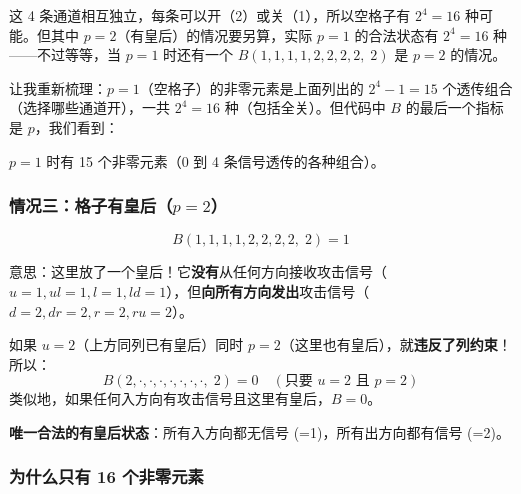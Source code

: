 \documentclass[12pt,a4paper]{article}
\begin{document}
这 4 条通道相互独立，每条可以开（2）或关（1），所以空格子有 $2^4 = 16$ 种可能。但其中 $p=2$（有皇后）的情况要另算，实际 $p=1$ 的合法状态有 $2^4 = 16$ 种——不过等等，当 $p=1$ 时还有一个 $B(1,1,1,1,2,2,2,2,\;2)$ 是 $p=2$ 的情况。

让我重新梳理：$p=1$（空格子）的非零元素是上面列出的 $2^4 - 1 = 15$ 个透传组合（选择哪些通道开），一共 $2^4 = 16$ 种（包括全关）。但代码中 $B$ 的最后一个指标是 $p$，我们看到：

$p=1$ 时有 15 个非零元素（0 到 4 条信号透传的各种组合）。

\subsubsection{情况三：格子有皇后（$p=2$）}

$$B(1,1,1,1,2,2,2,2,\;2) = 1$$

意思：这里放了一个皇后！它\textbf{没有}从任何方向接收攻击信号（$u=1, ul=1, l=1, ld=1$），但\textbf{向所有方向发出}攻击信号（$d=2, dr=2, r=2, ru=2$）。

\begin{warnbox}[为什么入方向都是 1？]
如果 $u=2$（上方同列已有皇后）同时 $p=2$（这里也有皇后），就\textbf{违反了列约束}！所以：
$$B(2,\cdot,\cdot,\cdot,\cdot,\cdot,\cdot,\cdot,\;2) = 0 \quad (\text{只要 } u=2 \text{ 且 } p=2)$$
类似地，如果任何入方向有攻击信号且这里有皇后，$B=0$。

\textbf{唯一合法的有皇后状态}：所有入方向都无信号 (=1)，所有出方向都有信号 (=2)。
\end{warnbox}

\subsubsection{为什么只有 16 个非零元素}
\end{document}
